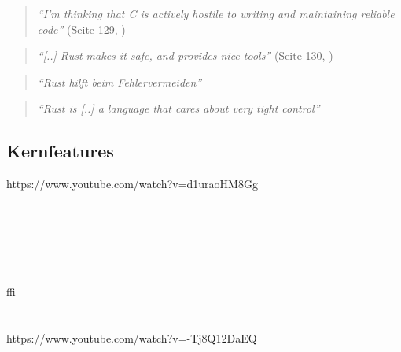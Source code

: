 \begin{quotation}
	\textit{\enquote{I’m thinking that C is actively hostile to writing and maintaining reliable code}} 
	(Seite 129, \cite{rust:c_is_hostile_mena})
\end{quotation}

\begin{quotation}
	\textit{\enquote{[..] Rust makes it safe, and  provides nice tools}} 
	(Seite 130, \cite{rust:c_is_hostile_mena})
\end{quotation}


\begin{quotation}
	\textit{\enquote{Rust hilft beim Fehlervermeiden}} 
	\cite{rust:c_is_hostile_golem}
\end{quotation}


\begin{quotation}
	\textit{\enquote{Rust is [..] a language that cares about very tight control}}
	\cite{rust:tight_control}
\end{quotation}

 \cite{rust:orly_rust}

\subsection{Kernfeatures}

https://www.youtube.com/watch?v=d1uraoHM8Gg \\
 \\
 \\
 \\
 \\
 \\
 \\
 \gls{ffi} \\
 \\
 \\

https://www.youtube.com/watch?v=-Tj8Q12DaEQ \\
 \\
 \\
 \\
 \\
 \\
 \\


